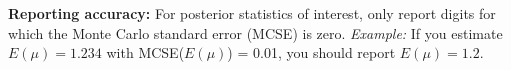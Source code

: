 \textbf{Reporting accuracy:} For posterior statistics of interest, only report digits for which the Monte Carlo standard error (MCSE) is zero. \emph{Example:} If you estimate $E(\mu)=1.234$ with MCSE($E(\mu)$) = 0.01, you should report $E(\mu)=1.2$.
